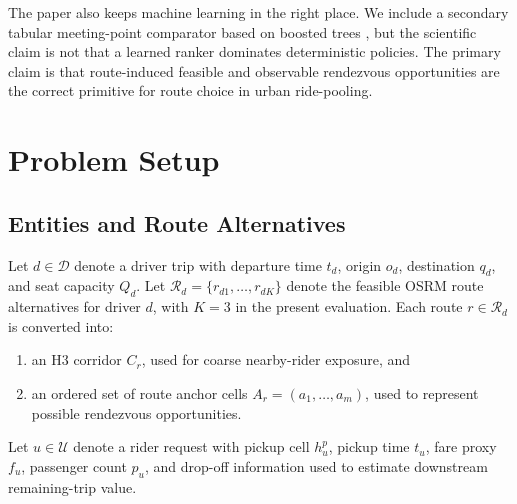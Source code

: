 \documentclass[journal]{IEEEtran}
\begin{document}
The paper also keeps machine learning in the right place. We include a secondary tabular meeting-point comparator based on boosted trees \cite{chen2016xgboost,ke2017}, but the scientific claim is not that a learned ranker dominates deterministic policies. The primary claim is that route-induced feasible and observable rendezvous opportunities are the correct primitive for route choice in urban ride-pooling.

\section{Problem Setup}
\subsection{Entities and Route Alternatives}
Let $d \in \mathcal{D}$ denote a driver trip with departure time $t_d$, origin $o_d$, destination $q_d$, and seat capacity $Q_d$. Let $\mathcal{R}_d = \{r_{d1}, \ldots, r_{dK}\}$ denote the feasible OSRM route alternatives for driver $d$, with $K=3$ in the present evaluation. Each route $r \in \mathcal{R}_d$ is converted into:
\begin{enumerate}
\item an H3 corridor $C_r$, used for coarse nearby-rider exposure, and
\item an ordered set of route anchor cells $A_r = (a_1, \ldots, a_m)$, used to represent possible rendezvous opportunities.
\end{enumerate}

Let $u \in \mathcal{U}$ denote a rider request with pickup cell $h_u^p$, pickup time $t_u$, fare proxy $f_u$, passenger count $p_u$, and drop-off information used to estimate downstream remaining-trip value.
\end{document}
